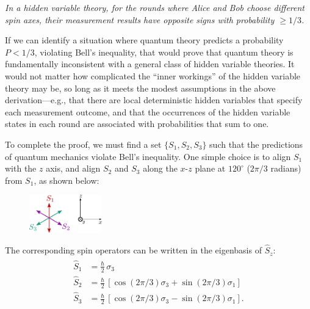 \documentclass[pra,12pt]{revtex4-2}
\begin{document}
\begin{framed}
\noindent
\textit{In a hidden variable theory, for the rounds where Alice and
  Bob choose different spin axes, their measurement results have
  opposite signs with probability $\ge 1/3$.}
\end{framed}

If we can identify a situation where quantum theory predicts a
probability $P < 1/3$, violating Bell's inequality, that would prove
that quantum theory is fundamentally inconsistent with a general class
of hidden variable theories.  It would not matter how complicated the
``inner workings'' of the hidden variable theory may be, so long as it
meets the modest assumptions in the above derivation---e.g., that
there are local deterministic hidden variables that specify each
measurement outcome, and that the occurrences of the hidden variable
states in each round are associated with probabilities that sum to
one.

To complete the proof, we must find a set $\{S_1, S_2, S_3\}$ such
that the predictions of quantum mechanics violate Bell's inequality.
One simple choice is to align $S_1$ with the $z$ axis, and align $S_2$
and $S_3$ along the $x$-$z$ plane at $120^\circ$ ($2\pi/3$ radians)
from $S_1$, as shown below:

\begin{figure}[h]
  \centering\includegraphics[width=0.28\textwidth]{bellaxes}
\end{figure}

The corresponding spin operators can be written in the eigenbasis of
$\hat{S}_z$:
\begin{align}
  \begin{aligned}\hat{S}_1 &= \frac{\hbar}{2} \, \sigma_3 \\ \hat{S}_2 &= \frac{\hbar}{2} \, \left[\cos(2\pi/3) \sigma_3 + \sin(2\pi/3)\sigma_1\right]  \\   \hat{S}_3 &= \frac{\hbar}{2} \, \left[\cos(2\pi/3) \sigma_3 - \sin(2\pi/3)\sigma_1\right].\end{aligned}
\end{align}
\end{document}
